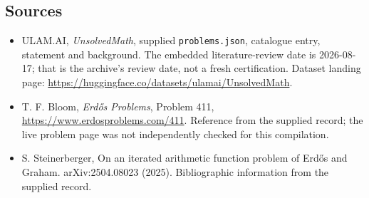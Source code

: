 \documentclass[11pt,a4paper]{article}
\begin{document}
\subsection{Sources}

{\small

\begin{itemize}

\item[\hypertarget{source:statement:1}{S1}] ULAM.AI, \emph{UnsolvedMath}, supplied \texttt{problems.json}, catalogue entry, statement and background. The embedded literature-review date is 2026-08-17; that is the archive’s review date, not a fresh certification. Dataset landing page: \url{https://huggingface.co/datasets/ulamai/UnsolvedMath}.

\item[\hypertarget{source:statement:2}{S2}] T. F. Bloom, \emph{Erdős Problems}, Problem 411, \url{https://www.erdosproblems.com/411}. Reference from the supplied record; the live problem page was not independently checked for this compilation.

\item[\hypertarget{source:statement:3}{S3}] S. Steinerberger, On an iterated arithmetic function problem of Erd\H{o}s and Graham. arXiv:2504.08023 (2025). Bibliographic information from the supplied record.

\end{itemize}

}

\label{end:statement}
\end{document}
